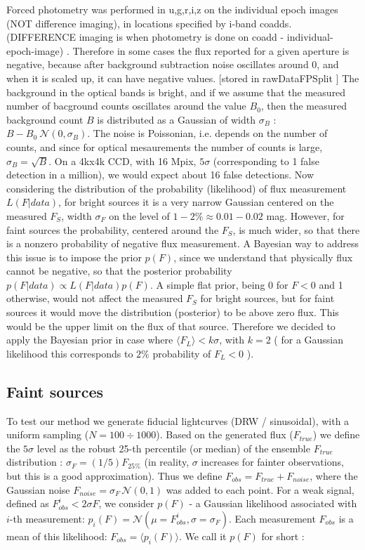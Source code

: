 \documentclass[fleqn,usenatbib]{mnras}  %
\begin{document}
Forced photometry was performed in u,g,r,i,z  on the individual epoch images (NOT difference imaging),  in locations specified by i-band coadds. (DIFFERENCE imaging is when photometry is done on  coadd - individual-epoch-image) . Therefore in some cases the flux reported for a given aperture is negative, because after background subtraction noise oscillates around 0, and when it is scaled up,  it can have negative values. [stored in rawDataFPSplit ]  The background in the  optical bands is bright, and if we assume that the measured number of bacground counts oscillates around the value $B_{0}$, then the measured background count $B$  is distributed as  a Gaussian of width $\sigma_{B}$ :   $B-B_{0}  ~  \mathcal{N}(0,\sigma_{B})$. The noise is Poissonian, i.e. depends on  the number of counts, and since for optical mesaurements the number of counts is large,  $\sigma_{B} = \sqrt {B}$. On a 4kx4k  CCD, with 16 Mpix, $5\sigma$ (corresponding  to  1 false detection in a million), we would expect about 16 false detections.  
Now considering the distribution of the probability (likelihood) of flux measurement   $L(F|data)$, for bright sources it is a very narrow Gaussian centered on the measured $F_{S}$, width $\sigma_{F}$ on the level of $1-2 \%  \approx 0.01-0.02$ mag. However, for faint sources the probability, centered around the $F_{S}$, is much wider, so that there is a nonzero probability of negative flux measurement. A Bayesian  way to address this issue is to impose the prior $p(F)$, since we understand that physically flux cannot be negative, so that the posterior probability $p(F|data) \propto L(F|data) p(F)$. A simple flat prior, being 0 for $F<0$ and 1 otherwise,  would not affect the measured $F_S$ for bright sources, but for faint sources it would move the distribution (posterior) to be above zero flux. This would be the upper limit on the flux of that source.  Therefore we decided to apply the Bayesian prior  in case where  $ \langle F_{L} \rangle  < k \sigma$, with $k=2$ ( for a Gaussian likelihood this  corresponds to $2\%$ probability of $F_{L} < 0$ ). 

\subsection{Faint sources}


To test our method we generate fiducial lightcurves (DRW / sinusoidal), with a uniform sampling ($N=100\div1000$). Based on the generated flux ($F_{true}$) we define the $5\sigma$ level as the robust 25-th percentile (or median) of the ensemble $F_{true}$ distribution :  $\sigma_{F} = (1/5)  F_{25 \%}$ (in reality, $\sigma$ increases for fainter observations, but this is a good approximation). Thus we define $F_{obs} = F_{true} + F_{noise}$, where the Gaussian noise $F_{noise} = \sigma_{F}  \, \mathcal{N}(0,1)$ was added to each point. 
For a weak signal, defined as $F_{obs}^{i} < 2 \sigma{F}$, we consider $p(F)$  - a  Gaussian  likelihood associated with $i$-th measurement: $p_{i}(F) = \mathcal{N}(\mu=F_{obs}^{i}, \sigma=\sigma_{F})$. Each measurement $F_{obs}$ is a mean of this likelihood: $F_{obs} = \langle p_{i}(F) \rangle$. We call it $p(F)$  for short : 
\end{document}
